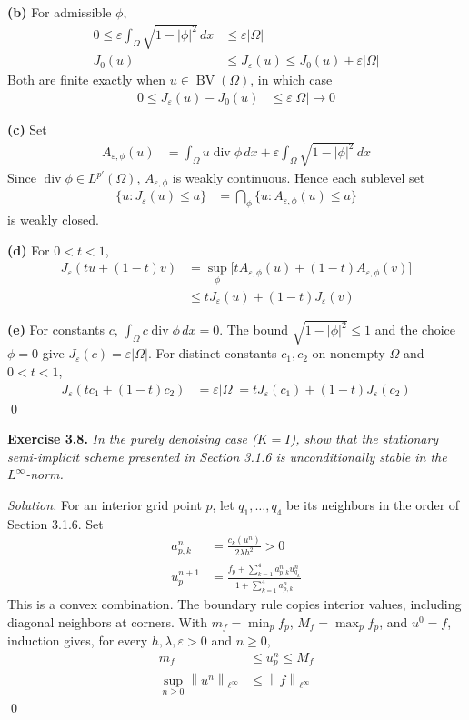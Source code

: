 \documentclass[12pt,letterpaper]{article}
\newcommand{\BV}{\operatorname{BV}}
\newcommand{\diver}{\operatorname{div}}
\newcommand{\dx}{\,dx}
\newcommand{\eps}{\varepsilon}
\newcommand{\norm}[1]{\left\lVert #1\right\rVert}
\newcommand{\exercise}[1]{%
  \par\bigskip\noindent\textbf{Exercise #1.}\enspace}
\newenvironment{statement}{\itshape\ignorespaces}{\par}
\newcommand{\solution}{\par\medskip\noindent\textit{Solution.}\enspace}
\newcommand{\partlabel}[1]{\par\medskip\noindent\textbf{(#1)}\enspace}
\newcommand{\finish}{\qed\par}
\begin{document}
\partlabel{b}
For admissible $\phi$,
\begin{align*}
 0\le\eps\int_\Omega\sqrt{1-|\phi|^2}\dx&\le\eps|\Omega|\\
 J_0(u)&\le J_\eps(u)\le J_0(u)+\eps|\Omega|
\end{align*}
Both are finite exactly when $u\in\BV(\Omega)$, in which case
\begin{align*}
 0\le J_\eps(u)-J_0(u)&\le\eps|\Omega|\longrightarrow0
\end{align*}

\partlabel{c}
Set
\begin{align*}
 A_{\eps,\phi}(u)&=\int_\Omega u\diver\phi\dx
           +\eps\int_\Omega\sqrt{1-|\phi|^2}\dx
\end{align*}
Since $\diver\phi\in L^{p'}(\Omega)$, $A_{\eps,\phi}$ is weakly
continuous. Hence each sublevel set
\begin{align*}
 \{u:J_\eps(u)\le a\}
 &=\bigcap_{\phi}\{u:A_{\eps,\phi}(u)\le a\}
\end{align*}
is weakly closed.

\partlabel{d}
For $0<t<1$,
\begin{align*}
 J_\eps(tu+(1-t)v)
 &=\sup_\phi\bigl[tA_{\eps,\phi}(u)+(1-t)A_{\eps,\phi}(v)\bigr]\\
 &\le tJ_\eps(u)+(1-t)J_\eps(v)
\end{align*}

\partlabel{e}
For constants $c$, $\int_\Omega c\diver\phi\dx=0$.
The bound $\sqrt{1-|\phi|^2}\le1$ and the choice $\phi=0$ give
$J_\eps(c)=\eps|\Omega|$. For distinct constants $c_1,c_2$ on
nonempty $\Omega$ and $0<t<1$,
\begin{align*}
 J_\eps(tc_1+(1-t)c_2)
 &=\eps|\Omega|=tJ_\eps(c_1)+(1-t)J_\eps(c_2)
\end{align*}
\finish


\newpage
\begin{samepage}
\exercise{3.8}
\begin{statement}
In the purely denoising case ($K=I$), show that the stationary semi-implicit scheme presented in Section 3.1.6 is unconditionally stable in the $L^\infty$-norm.
\end{statement}
\end{samepage}

\solution
For an interior grid point $p$, let $q_1,\ldots,q_4$ be its
neighbors in the order of Section 3.1.6. Set
\begin{align*}
 a^n_{p,k}&=\frac{c_k(u^n)}{2\lambda h^2}>0\\
 u^{n+1}_p
 &=\frac{f_p+\sum_{k=1}^4a^n_{p,k}u^n_{q_k}}
          {1+\sum_{k=1}^4a^n_{p,k}}
\end{align*}
This is a convex combination. The boundary rule copies interior
values, including diagonal neighbors at corners. With
$m_f=\min_p f_p$, $M_f=\max_p f_p$, and $u^0=f$, induction gives,
for every $h,\lambda,\eps>0$ and $n\ge0$,
\begin{align*}
 m_f&\le u^n_p\le M_f\\
 \sup_{n\ge0}\norm{u^n}_{\ell^\infty}
 &\le\norm{f}_{\ell^\infty}
\end{align*}
\finish
\end{document}
